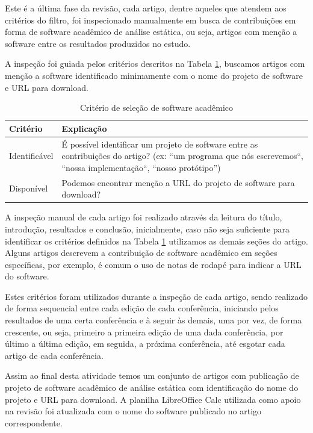 Este é a última fase da revisão, cada artigo, dentre aqueles que atendem aos
critérios do filtro, foi inspecionado manualmente em busca de contribuições em
forma de software acadêmico de análise estática, ou seja, artigos com menção a
software entre os resultados produzidos no estudo.

A inspeção foi guiada pelos critérios descritos na Tabela
\ref{criterios-selecao}, buscamos artigos com menção a software identificado
minimamente com o nome do projeto de software e URL para download.

\begin{table}[h]
\caption{Critério de seleção de software acadêmico}
\centering
\begin{tabular}{ l p{12cm} }
  \hline
  Critério         & Explicação \\
  \hline
  Identificável    & É possível identificar um projeto de software entre as contribuições do artigo? (ex: ``um programa que nós escrevemos``, ``nossa implementação``, ``nosso protótipo'') \\
  Disponível       & Podemos encontrar menção a URL do projeto de software para download? \\
  \hline
\end{tabular}
\label{criterios-selecao}
\end{table}

A inspeção manual de cada artigo foi realizado através da leitura do título,
introdução, resultados e conclusão, inicialmente, caso não seja suficiente para
identificar os critérios definidos na Tabela \ref{criterios-selecao} utilizamos
as demais seções do artigo. Alguns artigos descrevem a contribuição de software
acadêmico em seções específicas, por exemplo, é comum o uso de notas de rodapé
para indicar a URL do software.

Estes critérios foram utilizados durante a inspeção de cada artigo, sendo
realizado de forma sequencial entre cada edição de cada conferência, iniciando
pelos resultados de uma certa conferência e à seguir às demais, uma por vez, de
forma crescente, ou seja, primeiro a primeira edição de uma dada conferência,
por último a última edição, em seguida, a próxima conferência, até esgotar cada
artigo de cada conferência.

Assim ao final desta atividade temos um conjunto de artigos com publicação de
projeto de software acadêmico de análise estática com identificação do nome do
projeto e URL para download. A planilha LibreOffice Calc utilizada como apoio
na revisão foi atualizada com o nome do software publicado no artigo
correspondente.

